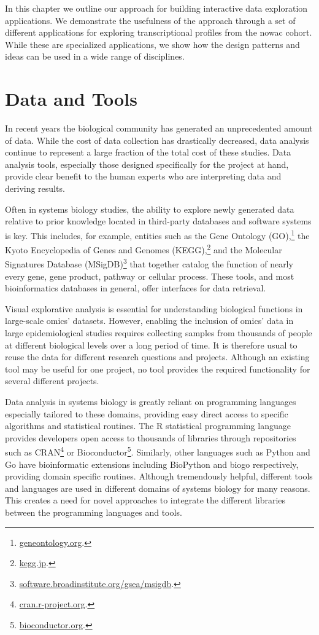 In this chapter we outline our approach for building interactive data
exploration applications. We demonstrate the usefulness of the approach through
a set of different applications for exploring transcriptional profiles from the
\gls{nowac} cohort. While these are specialized applications, we show how the
design patterns and ideas can be used in a wide range of disciplines. 

\section{Data and Tools} 
In recent years the biological community has  generated  an unprecedented amount
of data.  While the cost of data collection has drastically decreased, data
analysis continue to represent a large fraction of the total  cost of these
studies.\cite{sboner2011real} Data analysis tools, especially those designed
specifically for the project at hand, provide clear benefit to the human experts
who are interpreting data and deriving results.

Often in systems biology studies, the ability to explore newly generated data
relative to prior knowledge located in third-party databases and software
systems is key.  This includes, for example, entities such as the Gene
Ontology (GO),\footnote{\url{geneontology.org}.} the Kyoto Encyclopedia of Genes
and Genomes (KEGG),\footnote{\url{kegg.jp}.} and the Molecular Signatures
Database (MSigDB)\footnote{\url{software.broadinstitute.org/gsea/msigdb}.} that
together
catalog the function of nearly every gene, gene product, pathway or cellular
process. These tools, and most bioinformatics databases in general, offer
interfaces for data retrieval.

Visual explorative analysis is essential for understanding biological
functions in large-scale omics' datasets. However, enabling the inclusion of
omics' data in large epidemiological studies requires collecting samples
from thousands of people at different biological levels over a long period
of time.  It is therefore usual to reuse the data for different research
questions and projects.  Although an existing tool may be useful for one
project, no tool provides the required functionality for several different
projects. 

Data analysis in systems biology is greatly reliant on programming languages
especially tailored to these domains, providing easy direct access to specific
algorithms and statistical routines.  The R statistical programming language
provides developers open access to thousands of libraries through  repositories
such as CRAN\footnote{\url{cran.r-project.org}.} or
Bioconductor\footnote{\url{bioconductor.org}.}.  Similarly, other languages such
as  Python and Go have bioinformatic extensions including
BioPython\cite{biopython} and biogo\cite{biogo}  respectively, providing domain
specific routines.  Although  tremendously helpful, different tools and
languages are used in different domains of systems biology for many reasons.
This creates a need for novel approaches to integrate the different libraries
between the programming languages and tools.



